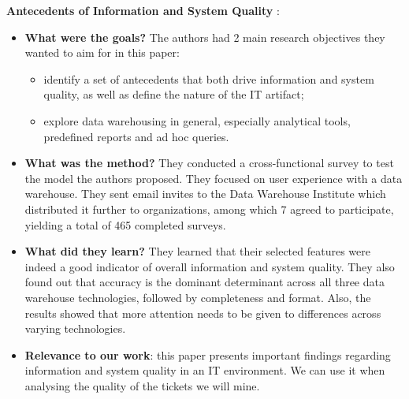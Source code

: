 \documentclass{mprop}
\begin{document}
\textbf{Antecedents of Information and System Quality}
\cite{nelson2005antecedents}:
\begin{itemize}
  \item \textbf{What were the goals?}
    The authors had 2 main research objectives they wanted to aim for in this
    paper:
      \begin{itemize}
        \item identify a set of antecedents that both drive information and
          system quality, as well as define the nature of the IT artifact;
        \item explore data warehousing in general, especially analytical tools,
          predefined reports and ad hoc queries.
        \end{itemize}
  \item \textbf{What was the method?}
    They conducted a cross-functional survey to test the model the authors 
    proposed. They focused on user experience with a data warehouse. They sent
    email invites to the Data Warehouse Institute which distributed it further
    to organizations, among which 7 agreed to participate, yielding a total of
    465 completed surveys. 
  \item \textbf{What did they learn?}
    They learned that their selected features were indeed a good indicator of
    overall information and system quality. They also found out that accuracy is
    the dominant determinant across all three data warehouse technologies, 
    followed by completeness and format. Also, the results showed that more 
    attention needs to be given to differences across varying technologies. 
  \item \textbf{Relevance to our work}: this paper presents important findings
    regarding information and system quality in an IT environment. We can use it
    when analysing the quality of the tickets we will mine.
\end{itemize}
\end{document}

